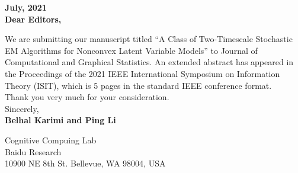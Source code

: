\documentclass[12pt]{letter}
\begin{document}
\textbf{July, 2021}\\

\textbf{Dear Editors, }

We are submitting our manuscript titled ``A Class of Two-Timescale Stochastic EM Algorithms for Nonconvex Latent Variable Models'' to Journal of Computational and Graphical Statistics. An extended abstract has appeared in the Proceedings of the 2021 IEEE International Symposium on Information Theory (ISIT), which is 5 pages in the standard IEEE conference format. \\

Thank you very much for your consideration. \\



Sincerely,\\

\textbf{Belhal Karimi and Ping Li}

Cognitive Compuing Lab\\
Baidu Research\\
10900 NE 8th St. Bellevue, WA 98004, USA
\end{document}
